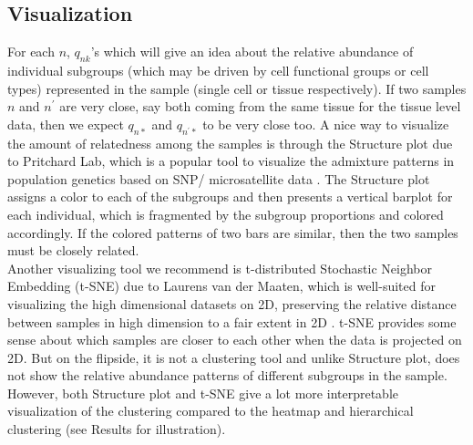 %
%

\subsection{Visualization}

For each $n$, $q_{nk}$'s which will give an idea about the relative abundance of individual subgroups (which may be driven by cell functional groups or cell types) represented in the sample (single cell or tissue respectively). If two samples $n$ and $n^{'}$ are very close, say both coming from the same tissue for the tissue level data, then we expect $q_{n*}$ and $q_{n^{'}*}$ to be very close too. A nice way to visualize the amount of relatedness among the samples is through the Structure plot due to Pritchard Lab, which is a popular tool to visualize the admixture patterns in population genetics based on SNP/ microsatellite data \cite{Pritchard2000} \cite{Raj2014}. The Structure plot  assigns a color to each of the subgroups and then presents a vertical barplot for each individual, which is fragmented by the subgroup proportions and colored accordingly. If the colored patterns of two bars are similar, then the two samples must be closely related. \\[1 pt]
Another visualizing tool we recommend is t-distributed Stochastic Neighbor Embedding (t-SNE) due to Laurens van der Maaten, which is well-suited for visualizing the high dimensional datasets on 2D, preserving the relative distance between samples in high dimension to a fair extent in 2D \cite{Maaten2008} \cite{Maaten2014}. t-SNE provides some sense about which samples are closer to each other when the data is projected on 2D. But on the flipside, it is not a clustering tool and unlike Structure plot, does not show the relative abundance patterns of different subgroups in the sample. However, both Structure plot and t-SNE give a lot more interpretable visualization of the clustering compared to the heatmap and hierarchical clustering (see Results for illustration).

